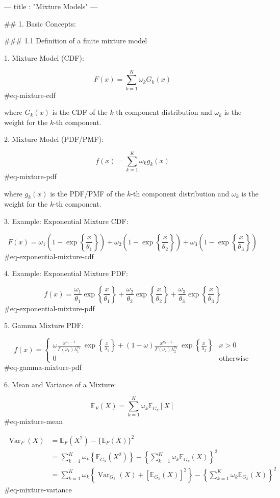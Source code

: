 ---
title : "Mixture Models"
---



## 1. Basic Concepts:

### 1.1 Definition of a finite mixture model

1. Mixture Model (CDF):

$$
F(x) = \sum_{k=1}^K \omega_k G_k(x)
$$ {#eq-mixture-cdf}

where $G_k(x)$ is the CDF of the $k$-th component distribution and $\omega_k$ is the weight for the $k$-th component.

2. Mixture Model (PDF/PMF):

$$
f(x) = \sum_{k=1}^K \omega_k g_k(x)
$$ {#eq-mixture-pdf}

where $g_k(x)$ is the PDF/PMF of the $k$-th component distribution and $\omega_k$ is the weight for the $k$-th component.

3. Example: Exponential Mixture CDF:

$$
F(x) = \omega_1 \left(1 - \exp\left\{\frac{x}{\theta_1}\right\}\right)
     + \omega_2 \left(1 - \exp\left\{\frac{x}{\theta_2}\right\}\right)
     + \omega_3 \left(1 - \exp\left\{\frac{x}{\theta_3}\right\}\right)
$$ {#eq-exponential-mixture-cdf}

4. Example: Exponential Mixture PDF:

$$
f(x) = \frac{\omega_1}{\theta_1} \exp\left\{\frac{x}{\theta_1}\right\}
    + \frac{\omega_2}{\theta_2} \exp\left\{\frac{x}{\theta_2}\right\}
    + \frac{\omega_3}{\theta_3} \exp\left\{\frac{x}{\theta_3}\right\}
$$ {#eq-exponential-mixture-pdf}

5. Gamma Mixture PDF:

$$
f(x) =
\begin{cases}
    \omega \frac{x^{\nu_1-1}}{\Gamma(\nu_1)\lambda_1^{\nu_1}}\ \exp \left\{\frac{x}{\lambda_1}\right\}
    + (1-\omega) \frac{x^{\nu_2-1}}{\Gamma(\nu_2)\lambda_2^{\nu_2}}\ \exp \left\{\frac{x}{\lambda_2}\right\} & x > 0 \\
    0 & \text{otherwise}
\end{cases}
$$ {#eq-gamma-mixture-pdf}

6. Mean and Variance of a Mixture:

$$
\mathbb{E}_F(X) = \sum_{k=1}^K \omega_k \mathbb{E}_{G_k}[X]
$$ {#eq-mixture-mean}

$$
\begin{aligned}
\operatorname{Var}_F(X) & = \mathbb{E}_F(X^2) - \{\mathbb{E}_F(X)\}^2 \\
& = \sum_{k=1}^K \omega_k \left\{ \mathbb{E}_{G_k}(X^2) \right\} - \left\{ \sum_{k=1}^K \omega_k \mathbb{E}_{G_k}(X) \right\}^2 \\
& = \sum_{k=1}^K \omega_k \left\{ \operatorname{Var}_{G_k}(X) + [\mathbb{E}_{G_k}(X)]^2 \right\} - \left\{ \sum_{k=1}^K \omega_k \mathbb{E}_{G_k}(X) \right\}^2
\end{aligned}
$$ {#eq-mixture-variance}

